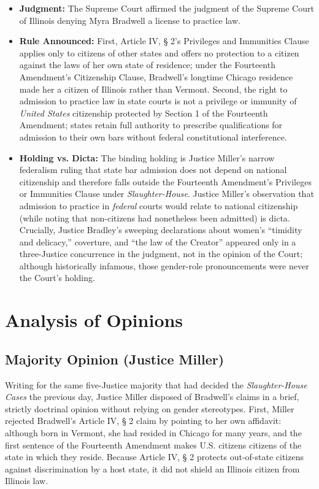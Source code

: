 \documentclass[12pt]{article}
\begin{document}
\begin{itemize}
  \item \textbf{Judgment:} The Supreme Court affirmed the judgment of the Supreme Court of Illinois denying Myra Bradwell a license to practice law.
  \item \textbf{Rule Announced:} First, Article IV, \S{} 2's Privileges and Immunities Clause applies only to citizens of other states and offers no protection to a citizen against the laws of her own state of residence; under the Fourteenth Amendment's Citizenship Clause, Bradwell's longtime Chicago residence made her a citizen of Illinois rather than Vermont. Second, the right to admission to practice law in state courts is not a privilege or immunity of \textit{United States} citizenship protected by Section 1 of the Fourteenth Amendment; states retain full authority to prescribe qualifications for admission to their own bars without federal constitutional interference.
  \item \textbf{Holding vs. Dicta:} The binding holding is Justice Miller's narrow federalism ruling that state bar admission does not depend on national citizenship and therefore falls outside the Fourteenth Amendment's Privileges or Immunities Clause under \textit{Slaughter-House}. Justice Miller's observation that admission to practice in \textit{federal} courts would relate to national citizenship (while noting that non-citizens had nonetheless been admitted) is dicta. Crucially, Justice Bradley's sweeping declarations about women's ``timidity and delicacy,'' coverture, and ``the law of the Creator'' appeared only in a three-Justice concurrence in the judgment, not in the opinion of the Court; although historically infamous, those gender-role pronouncements were never the Court's holding.
\end{itemize}

\section{Analysis of Opinions}

\subsection{Majority Opinion (Justice Miller)}

Writing for the same five-Justice majority that had decided the \textit{Slaughter-House Cases} the previous day, Justice Miller disposed of Bradwell's claims in a brief, strictly doctrinal opinion without relying on gender stereotypes. First, Miller rejected Bradwell's Article IV, \S{} 2 claim by pointing to her own affidavit: although born in Vermont, she had resided in Chicago for many years, and the first sentence of the Fourteenth Amendment makes U.S. citizens citizens of the state in which they reside. Because Article IV, \S{} 2 protects out-of-state citizens against discrimination by a host state, it did not shield an Illinois citizen from Illinois law.
\end{document}
